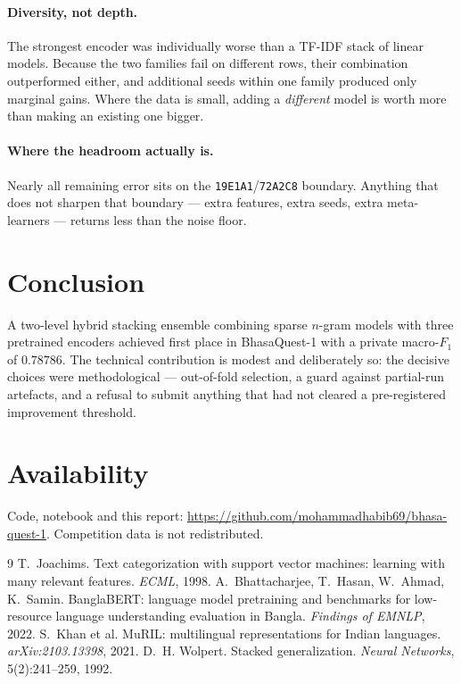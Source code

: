 \documentclass[11pt,a4paper]{article}
\begin{document}
\paragraph{Diversity, not depth.}
The strongest encoder was individually worse than a TF-IDF stack of linear models. Because the two
families fail on different rows, their combination outperformed either, and additional seeds within
one family produced only marginal gains. Where the data is small, adding a \emph{different} model is
worth more than making an existing one bigger.

\paragraph{Where the headroom actually is.}
Nearly all remaining error sits on the \texttt{19E1A1}/\texttt{72A2C8} boundary. Anything that does
not sharpen that boundary --- extra features, extra seeds, extra meta-learners --- returns less than
the noise floor.

\section{Conclusion}

A two-level hybrid stacking ensemble combining sparse $n$-gram models with three pretrained encoders
achieved first place in BhasaQuest-1 with a private macro-$F_1$ of $0.78786$. The technical
contribution is modest and deliberately so: the decisive choices were methodological --- out-of-fold
selection, a guard against partial-run artefacts, and a refusal to submit anything that had not
cleared a pre-registered improvement threshold.

\section*{Availability}
Code, notebook and this report: \url{https://github.com/mohammadhabib69/bhasa-quest-1}.
Competition data is not redistributed.

\begin{thebibliography}{9}
 T.~Joachims. Text categorization with support vector machines: learning with
many relevant features. \emph{ECML}, 1998.
 A.~Bhattacharjee, T.~Hasan, W.~Ahmad, K.~Samin.
BanglaBERT: language model pretraining and benchmarks for low-resource language understanding
evaluation in Bangla. \emph{Findings of EMNLP}, 2022.
 S.~Khan et al. MuRIL: multilingual representations for Indian languages.
\emph{arXiv:2103.13398}, 2021.
 D.~H. Wolpert. Stacked generalization. \emph{Neural Networks}, 5(2):241--259,
1992.
\end{thebibliography}
\end{document}
